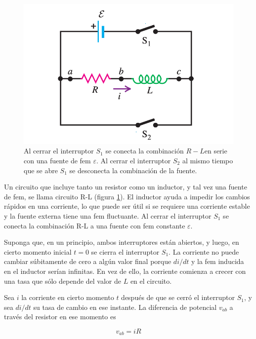 \begin{figure}[h]
\centering
\includegraphics[scale=0.4]{fig/circuito2}
\caption{Al cerrar el interruptor $S_1$ se conecta la combinación $R-L $en serie con una fuente de fem $\varepsilon$. Al cerrar el interruptor $S_2$ al mismo tiempo que se abre $S_1$ se desconecta la combinación de la fuente.}
\label{fig:circuito2}
\end{figure}

Un circuito que incluye tanto un resistor como un inductor, y tal vez una fuente de fem, se llama circuito R-L (figura \ref{fig:circuito2}).  El inductor ayuda a impedir los cambios rápidos en una corriente, lo que puede ser útil si se requiere una corriente estable y la fuente externa tiene una fem fluctuante. Al cerrar el interruptor $S_1$ se conecta la combinación R-L a una fuente con fem constante $\varepsilon$. 

Suponga que, en un principio, ambos interruptores están abiertos, y luego, en cierto momento inicial $t=0$ se cierra el interruptor $S_1$. La corriente no puede cambiar súbitamente de cero a algún valor final porque $di/dt$ y la fem inducida en el inductor serían infinitas. En vez de ello, la corriente comienza a crecer con una tasa que sólo depende del valor de $L$ en el circuito.

Sea $i$ la corriente en cierto momento $t$ después de que se cerró el interruptor $S_1$, y sea $di/dt$ su tasa de cambio en ese instante. La diferencia de potencial $v_{ab}$ a través del resistor en ese momento es

\begin{equation*}
v_{ab}=iR
\end{equation*}

